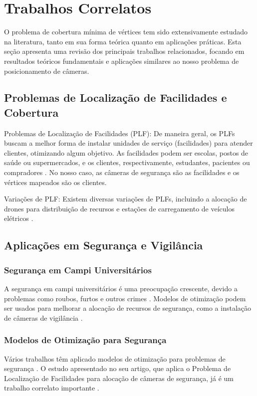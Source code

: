 \documentclass[12pt, a4paper]{report}
\begin{document}
\chapter{Trabalhos Correlatos}
O problema de cobertura mínima de vértices tem sido extensivamente estudado na literatura, tanto em sua forma teórica quanto em aplicações práticas. Esta seção apresenta uma revisão dos principais trabalhos relacionados, focando em resultados teóricos fundamentais e aplicações similares ao nosso problema de posicionamento de câmeras.

\section{Problemas de Localização de Facilidades e Cobertura}

Problemas de Localização de Facilidades (PLF): De maneira geral, os PLFs buscam a melhor forma de instalar unidades de serviço (facilidades) para atender clientes, otimizando algum objetivo. As facilidades podem ser escolas, postos de saúde ou supermercados, e os clientes, respectivamente, estudantes, pacientes ou compradores \cite{Pizzolato2012}. No nosso caso, as câmeras de segurança são as facilidades e os vértices mapeados são os clientes.

Variações de PLF: Existem diversas variações de PLFs, incluindo a alocação de drones para distribuição de recursos \cite{Chuan2019} e estações de carregamento de veículos elétricos \cite{Silva2019}.

\section{Aplicações em Segurança e Vigilância}

\subsection{Segurança em Campi Universitários}
A segurança em campi universitários é uma preocupação crescente, devido a problemas como roubos, furtos e outros crimes \cite{Costa2011}. Modelos de otimização podem ser usados para melhorar a alocação de recursos de segurança, como a instalação de câmeras de vigilância \cite{Cubas2013}.

\subsection{Modelos de Otimização para Segurança}
Vários trabalhos têm aplicado modelos de otimização para problemas de segurança \cite{Mello2015}. O estudo apresentado no seu artigo, que aplica o Problema de Localização de Facilidades para alocação de câmeras de segurança, já é um trabalho correlato importante \cite{Canuto2017}.
\end{document}

